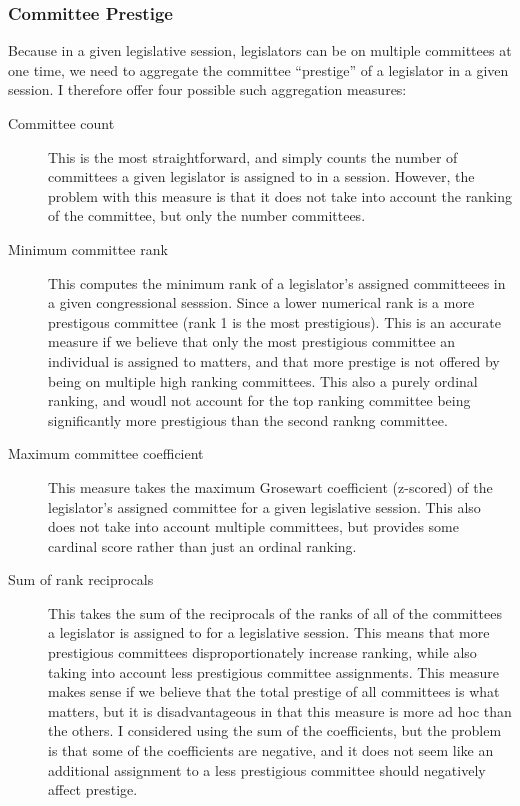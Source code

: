 \documentclass{article}
\begin{document}
\subsubsection{Committee Prestige}
Because in a given legislative session, legislators can be on multiple committees at one time, we need to aggregate the committee ``prestige'' of a legislator in a given session. I therefore offer four possible such aggregation measures:
\begin{description}
    \item[Committee count] This is the most straightforward, and simply counts the number of committees a given legislator is assigned to in a session. However, the problem with this measure is that it does not take into account the ranking of the committee, but only the number committees.
    \item[Minimum committee rank] This computes the minimum rank of a legislator's assigned committeees in a given congressional sesssion. Since a lower numerical rank is a more prestigous committee (rank 1 is the most prestigious). This is an accurate measure if we believe that only the most prestigious committee an individual is assigned to matters, and that more prestige is not offered by being on multiple high ranking committees. This also a purely ordinal ranking, and woudl not account for the top ranking committee being significantly more prestigious than the second rankng committee.
    \item[Maximum committee coefficient] This measure takes the maximum Grosewart coefficient (z-scored) of the legislator's assigned committee for a given legislative session. This also does not take into account multiple committees, but provides some cardinal score rather than just an ordinal ranking. 
    \item[Sum of rank reciprocals] This takes the sum of the reciprocals of the ranks of all of the committees a legislator is assigned to for a legislative session. This means that more prestigious committees disproportionately increase ranking, while also taking into account less prestigious committee assignments. This measure makes sense if we believe that the total prestige of all committees is what matters, but it is disadvantageous in that this measure is more ad hoc than the others. I considered using the sum of the coefficients, but the problem is that some of the coefficients are negative, and it does not seem like an additional assignment to a less prestigious committee should negatively affect prestige. 
\end{description}
\end{document}
